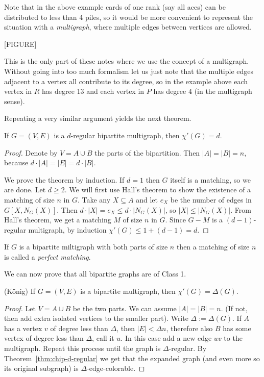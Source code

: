 Note that in the above example cards of one rank (say all aces) can be distributed to less than 4 piles, so it would be more convenient to represent the situation with a \emph{multigraph}, where multiple edges between vertices are allowed.

[FIGURE]

This is the only part of these notes where we use the concept of a multigraph. Without going into too much formalism let us just note that the multiple edges adjacent to a vertex all contribute to its degree, so in the example above each vertex in $R$ has degree 13 and each vertex in $P$ has degree $4$ (in the multigraph sense).

Repeating a very similar argument yields the next theorem.

\begin{theorem}
\label{thm:chip-d-regular}
If $G=(V,E)$ is a $d$-regular bipartite multigraph, then $\chi'(G)=d$.
\end{theorem}
\begin{proof}
Denote by $V=A\cup B$ the parts of the bipartition. Then $|A|=|B|=n$, because $d\cdot |A|=|E|=d\cdot |B|$. 

We prove the theorem by induction. If $d=1$ then $G$ itself is a matching, so we are done. Let $d\geq 2$. We will first use Hall's theorem to show the existence of a matching of size $n$ in $G$. Take any $X\subseteq A$ and let $e_X$ be the number of edges in $G[X,N_G(X)]$. Then $d\cdot |X|=e_X\leq d\cdot |N_G(X)|$, so $|X|\leq |N_G(X)|$. From Hall's theorem, we get a matching $M$ of size $n$ in $G$. Since $G-M$ is a $(d-1)$-regular multigraph, by induction $\chi'(G)\leq 1 + (d-1) = d$.
\end{proof}

\begin{remark}
If $G$ is a bipartite miltigraph with both parts of size $n$ then a matching of size $n$ is called a \emph{perfect matching}.
\end{remark}

We can now prove that all bipartite graphs are of Class 1.

\begin{theorem}(K\"onig)
If $G=(V,E)$ is a bipartite multigraph, then $\chi'(G)=\Delta (G)$.
\end{theorem}

\begin{proof}
Let $V=A\cup B$ be the two parts. We can assume $|A|=|B|=n$. (If not, then add extra isolated vertices to the smaller part). Write $\Delta := \Delta(G)$. If $A$ has a vertex $v$ of degree less than $\Delta$, then $|E|<\Delta n$, therefore also $B$ has some vertex of degree less than $\Delta$, call it $u$. In this case add a new edge $uv$ to the multigraph. Repeat this process until the graph is $\Delta$-regular. By Theorem~\ref{thm:chip-d-regular} we get that the expanded graph (and even more so its original subgraph) is $\Delta$-edge-colorable.
\end{proof}



